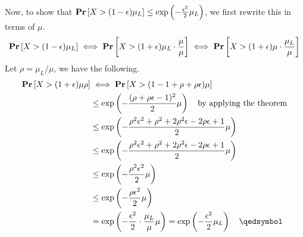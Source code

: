 Now, to show that $\mathbf{Pr}\left[X > (1 - \epsilon)\mu_L\right] \leq \exp\left(- \frac{\epsilon^2}{2}\mu_L\right)$, we first rewrite this in terms of $\mu$.
\[ \mathbf{Pr}\left[X > (1 - \epsilon)\mu_L\right] \iff \mathbf{Pr}\left[X > (1 + \epsilon)\mu_L\cdot\frac{\mu}{\mu}\right] \iff \mathbf{Pr}\left[X > (1 + \epsilon)\mu\cdot\frac{\mu_L}{\mu}\right] \]
Let $\rho = \mu_L / \mu$, we have the following.
\begin{equation*}
\begin{aligned}
	\pr{X > (1 + \epsilon)\mu\rho} &\iff \pr{X > (1 - 1 + \rho + \rho\epsilon)\mu} \\
								   &\leq \exp\left(-\frac{(\rho + \rho\epsilon - 1)^2}{2}\mu\right) \quad\text{by applying the theorem} \\
								   &\leq \exp\left(-\frac{\rho^2\epsilon^2 + \rho^2 + 2\rho^2\epsilon - 2\rho\epsilon + 1}{2}\mu\right)\\
								   &\leq \exp\left(-\frac{\rho^2\epsilon^2 + \rho^2 + 2\rho^2\epsilon - 2\rho\epsilon + 1}{2}\mu\right) \\
								   &\leq \exp\left(-\frac{\rho^2\epsilon^2}{2}\mu\right) \\
								   &\leq \exp\left(-\frac{\rho\epsilon^2}{2}\mu\right) \\
								   &= \exp\left(-\frac{\epsilon^2}{2}\cdot\frac{\mu_L}{\mu}\mu\right) = \exp\left(-\frac{\epsilon^2}{2}\mu_L\right) \quad \qedsymbol
\end{aligned}
\end{equation*}
